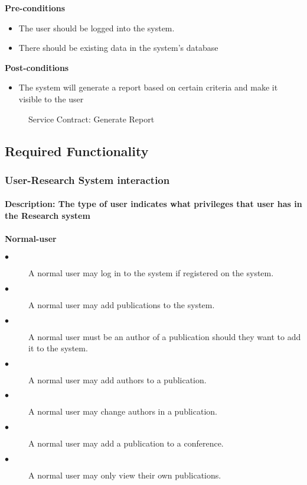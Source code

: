 \documentclass[a4paper]{article}
\begin{document}
	\textbf{Pre-conditions}
	\begin{itemize}
		\item The user should be logged into the system.
		\item There should be existing data in the system's database
	\end{itemize}
	
	\textbf{Post-conditions}
	\begin{itemize}
		\item The system will generate a report based on certain criteria and make it visible to the user
	\end{itemize}
	\begin{figure}[H]
		\centering
		\caption{Service Contract: Generate Report}
	\end{figure}
	
	\pagebreak	
	\subsection{Required Functionality}
	\subsubsection{User-Research System interaction}
	\paragraph{\textbf{Description:} The type of user indicates what privileges that user has in the Research system}
	\paragraph{\textbf{Normal-user}}
	\begin{description}
		\item[$\bullet$] A normal user may log in to the system if registered on the system.
		\item[$\bullet$] A normal user may add publications to the system.
		\item[$\bullet$] A normal user must be an author of a publication should they want to add it to the system.
		\item[$\bullet$] A normal user may add authors to a publication.
		\item[$\bullet$] A normal user may change authors in a publication.
		\item[$\bullet$] A normal user may add a publication to a conference.
		\item[$\bullet$] A normal user may only view their own publications.
	\end{description}
\end{document}
